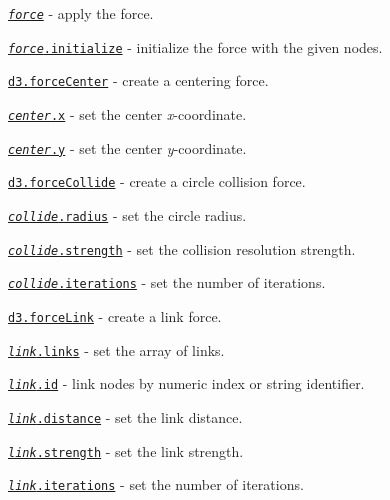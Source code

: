\begin{DoxyItemize}
\item \href{https://github.com/d3/d3-force/blob/master/README.md#_force}{\tt {\itshape force}} -\/ apply the force.
\item \href{https://github.com/d3/d3-force/blob/master/README.md#force_initialize}{\tt {\itshape force}.initialize} -\/ initialize the force with the given nodes.
\item \href{https://github.com/d3/d3-force/blob/master/README.md#forceCenter}{\tt d3.\+force\+Center} -\/ create a centering force.
\item \href{https://github.com/d3/d3-force/blob/master/README.md#center_x}{\tt {\itshape center}.x} -\/ set the center {\itshape x}-\/coordinate.
\item \href{https://github.com/d3/d3-force/blob/master/README.md#center_y}{\tt {\itshape center}.y} -\/ set the center {\itshape y}-\/coordinate.
\item \href{https://github.com/d3/d3-force/blob/master/README.md#forceCollide}{\tt d3.\+force\+Collide} -\/ create a circle collision force.
\item \href{https://github.com/d3/d3-force/blob/master/README.md#collide_radius}{\tt {\itshape collide}.radius} -\/ set the circle radius.
\item \href{https://github.com/d3/d3-force/blob/master/README.md#collide_strength}{\tt {\itshape collide}.strength} -\/ set the collision resolution strength.
\item \href{https://github.com/d3/d3-force/blob/master/README.md#collide_iterations}{\tt {\itshape collide}.iterations} -\/ set the number of iterations.
\item \href{https://github.com/d3/d3-force/blob/master/README.md#forceLink}{\tt d3.\+force\+Link} -\/ create a link force.
\item \href{https://github.com/d3/d3-force/blob/master/README.md#link_links}{\tt {\itshape link}.links} -\/ set the array of links.
\item \href{https://github.com/d3/d3-force/blob/master/README.md#link_id}{\tt {\itshape link}.id} -\/ link nodes by numeric index or string identifier.
\item \href{https://github.com/d3/d3-force/blob/master/README.md#link_distance}{\tt {\itshape link}.distance} -\/ set the link distance.
\item \href{https://github.com/d3/d3-force/blob/master/README.md#link_strength}{\tt {\itshape link}.strength} -\/ set the link strength.
\item \href{https://github.com/d3/d3-force/blob/master/README.md#link_iterations}{\tt {\itshape link}.iterations} -\/ set the number of iterations.

\end{DoxyItemize}

